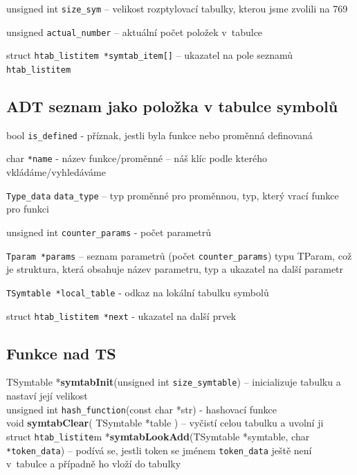 \documentclass[11pt,a4paper]{article}
\begin{document}
\noindent
unsigned int \verb|size_sym| -- velikost rozptylovací tabulky, kterou jsme zvolili na 769

\noindent
unsigned \verb|actual_number| -- aktuální počet položek  v~tabulce

\noindent
struct \verb|htab_listitem *symtab_item[]| -- ukazatel na pole seznamů \verb|htab_listitem|

\subsection{ADT seznam jako položka v tabulce symbolů}
bool \verb|is_defined| - příznak, jestli byla funkce nebo proměnná definovaná

\noindent
char \verb|*name| - název funkce/proměnné -- náš klíc podle kterého vkládáme/vyhledáváme

\noindent
\verb|Type_data| \verb|data_type| -- typ proměnné pro proměnnou, typ, který vrací funkce pro funkci

\noindent
unsigned int \verb|counter_params| - počet parametrů

\noindent
\verb|Tparam *params| -- seznam parametrů (počet \verb|counter_params|) typu TParam, což je struktura, která obsahuje název parametru, typ a ukazatel na další parametr

\noindent
\verb|TSymtable *local_table| - odkaz na lokální tabulku symbolů

\noindent
struct \verb|htab_listitem *next| - ukazatel na další prvek

\subsection{Funkce nad TS}

TSymtable *\textbf{symtabInit}(unsigned int \verb|size_symtable|) -- inicializuje tabulku a nastaví její velikost \\


\noindent
unsigned int \verb|hash_function|(const char *str) - hashovací funkce \\

\noindent
void \textbf{symtabClear}( TSymtable *table ) -- vyčistí celou tabulku a uvolní ji \\

\noindent
struct \verb|htab_listite|m *\textbf{symtabLookAdd}(TSymtable *symtable, char \verb|*token_data|) -- podívá se, jestli token se jménem \verb|token_data| ještě není v~tabulce a případně ho vloží do tabulky \\
\end{document}

